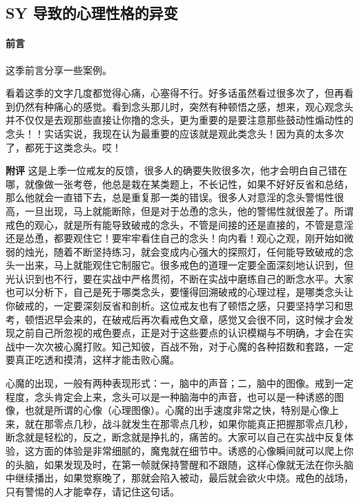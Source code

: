 \subsection{SY 导致的心理性格的异变}

\paragraph*{前言}

这季前言分享一些案例。

\begin{case}
    看着这季的文字几度都觉得心痛，心塞得不行。好多话虽然看过很多次了，但再看到仍然有种痛心的感觉。看到念头那儿时，突然有种顿悟之感，想来，观心观念头并不仅仅是去观那些直接让你撸的念头，更为重要的是要注意那些鼓动性煽动性的念头！！实话实说，我现在认为最重要的应该就是观此类念头！因为真的太多次了，都死于这类念头。哎！

    \textbf{附评} 这是上季一位戒友的反馈，很多人的确要失败很多次，他才会明白自己错在哪，就像做一张考卷，他总是栽在某类题上，不长记性，如果不好好反省和总结，那么他就会一直错下去，总是重复那一类的错误。很多人对意淫的念头警惕性很高，一旦出现，马上就能断除，但是对于怂恿的念头，他的警惕性就很差了。所谓戒色的观心，就是所有能导致破戒的念头，不管是间接的还是直接的，不管是意淫还是怂恿，都要观住它！要牢牢看住自己的念头！向内看！观心之观，刚开始如微弱的烛光，随着不断坚持练习，就会变成内心强大的探照灯，任何能导致破戒的念头一出来，马上就能观住它制服它。很多戒色的道理一定要全面深刻地认识到，但光认识到也不行，要在实战中严格贯彻，不断在实战中磨练自己的断念水平。大家也可以分析下，自己是死于哪类念头，要懂得回溯破戒的心理过程，是哪类念头让你破戒的，一定要深刻反省和剖析。这位戒友也有了顿悟之感，只要坚持学习和思考，顿悟迟早会来的，在破戒后再次看戒色文章，感觉又会很不同，这时候才会发现之前自己所忽视的戒色要点，正是对于这些要点的认识模糊与不明确，才会在实战中一次次被心魔打败。知己知彼，百战不殆，对于心魔的各种招数和套路，一定要真正吃透和摸清，这样才能击败心魔。

    心魔的出现，一般有两种表现形式：一，脑中的声音；二，脑中的图像。戒到一定程度，念头肯定会上来，念头可以是一种脑海中的声音，也可以是一种诱惑的图像，也就是所谓的心像（心理图像）。心魔的出手速度非常之快，特别是心像上来，就在那零点几秒，战斗就发生在那零点几秒，如果你能真正把握那零点几秒，断念就是轻松的，反之，断念就是挣扎的，痛苦的。大家可以自己在实战中反复体验，这方面的体验是非常细腻的，魔鬼就在细节中。诱惑的心像瞬间就可以爬上你的头脑，如果发现及时，在第一帧就保持警醒和不跟随，这样心像就无法在你头脑中继续播出，如果觉察晚了，那就会陷入被动，最后就会欲火中烧。戒色的战场，只有警惕的人才能幸存，请记住这句话。
\end{case}

